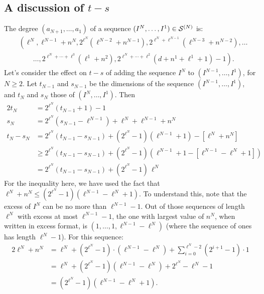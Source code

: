 \documentclass[10pt]{article}
\begin{document}
\begin{conjectured differentials}
\subsection{A discussion of $t-s$}
The degree $ (a_{N+1},\ldots,a_1) $ of a sequence $(I^N,\ldots,I^1)\in\mathcal{S}^{(N)}$ is:
\begin{align*}
& \left( \ell^N,\ell^{N-1}+n^N,2^{\ell^N}\!\left(\ell^{N-2}+n^{N-1}\right),2^{\ell^N+\ell^{N-1}}\!\left(\ell^{N-3}+n^{N-2}\right),\ldots \right.\\
 &\qquad \left.{}\ldots,2^{\ell^N+\cdots+\ell^{3}}(\ell^1+n^2),2^{\ell^N+\cdots+\ell^{2}}(d+n^1+\ell^1+1)-1 \right).
\end{align*}
Let's consider the effect on $t-s$ of adding the sequence $I^N$ to $(I^{N-1},\ldots,I^1)$, for $N\geq2$. Let $t_{N-1}$ and $s_{N-1}$ be the dimensions of the sequence $(I^{N-1},\ldots,I^1)$, and $t_N$ and $s_N$ those of $(I^{N},\ldots,I^1)$. Then
\begin{alignat*}{2}
t_N
&=
2^{\ell^N}(t_{N-1}+1)-1%
\\
s_N&=
2^{\ell^N}(s_{N-1}-\ell^{N-1})+\ell^{N}+\ell^{N-1}+n^N%
\\
t_N-s_N&=
2^{\ell^N}(t_{N-1}-s_{N-1})+(2^{\ell^N}-1)(\ell^{N-1}+1)-[\ell^{N}+n^N]%
\\
&\geq
2^{\ell^N}(t_{N-1}-s_{N-1})+(2^{\ell^N}-1)(\ell^{N-1}+1-[\ell^{N-1}-\ell^N+1])%
\\
&=
2^{\ell^N}(t_{N-1}-s_{N-1})+(2^{\ell^N}-1)\,\ell^{N}%
\end{alignat*}
For the inequality here, we have used the fact that $\ell^N+n^N\leq(2^{\ell^N}-1)(\ell^{N-1}-\ell^N+1)$. To understand this, note that the excess of $I^N$ can be no more than $\ell^{N-1}-1$. Out of those sequences of length $\ell^N$ with excess at most $\ell^{N-1}-1$, the one with largest value of $n^N$, when written in excess format, is $(1,\ldots,1,\ell^{N-1}-\ell^N)$ (where the sequence of ones has length $\ell^N-1$). For this sequence:
\begin{alignat*}{2}
\ell^N+n^N
&=
\ell^N+(2^{\ell^N}-1)\cdot(\ell^{N-1}-\ell^N)+\textstyle\sum_{i=0}^{\ell^N-2}\left(2^{i+1}-1\right)\cdot 1%
\\
&=
\ell^N+(2^{\ell^N}-1)(\ell^{N-1}-\ell^N)+2^{\ell^N}-\ell^N-1%
\\
&=
(2^{\ell^N}-1)(\ell^{N-1}-\ell^N+1).%
\end{alignat*}


\end{conjectured differentials}
\end{document}
